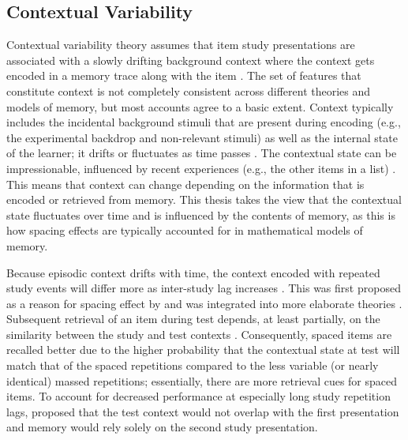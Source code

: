
\subsection{Contextual Variability}

Contextual variability theory assumes that item study presentations are associated with a slowly drifting background context where the context gets encoded in a memory trace along with the item \cite{Bowe1972,Este1955a,Melt1970}.
The set of features that constitute context is not completely consistent across different theories and models of memory, but most accounts agree to a basic extent.  Context typically includes the incidental background stimuli that are present during encoding (e.g., the experimental backdrop and non-relevant stimuli) as well as the internal state of the learner; it drifts or fluctuates as time passes \cite{Glen1979,LohnEtal2011,MalmShif2005,Raai2003}.  The contextual state can be impressionable, influenced by recent experiences (e.g., the other items in a list) \cite{HowaKaha2002,SedeEtal2008}.  This means that context can change depending on the information that is encoded or retrieved from memory.  This thesis takes the view that the contextual state fluctuates over time and is influenced by the contents of memory, as this is how spacing effects are typically accounted for in mathematical models of memory.


Because episodic context drifts with time, the context encoded with repeated study events will differ more as inter-study lag increases \cite{Este1955a}.  This was first proposed as a reason for spacing effect by  and was integrated into more elaborate theories \cite{Bowe1972,Glen1976,Glen1979}.  Subsequent retrieval of an item during test depends, at least partially, on the similarity between the study and test contexts \cite<in line with the encoding specificity principle>{TulvThom1973}.  Consequently, spaced items are recalled better due to the higher probability that the contextual state at test will match that of the spaced repetitions compared to the less variable (or nearly identical) massed repetitions; essentially, there are more retrieval cues for spaced items.  To account for decreased performance at especially long study repetition lags,  proposed that the test context would not overlap with the first presentation and memory would rely solely on the second study presentation.

